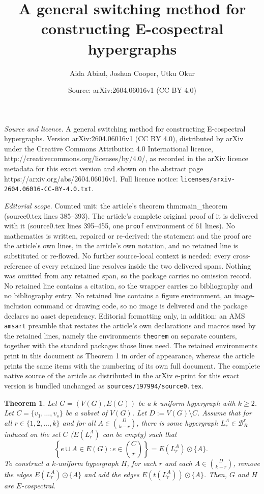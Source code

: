 \documentclass[10pt,a4paper]{amsart}
\title{A general switching method for constructing E-cospectral hypergraphs}
\author{Aida Abiad, Joshua Cooper, Utku Okur}
\date{Source: arXiv:2604.06016v1 (CC BY 4.0)}
\newtheorem{theorem}{Theorem}
\newcommand{\ev}[1]{( #1 )}
\begin{document}
\maketitle

\noindent\emph{Source and licence.} A general switching method for constructing E-cospectral hypergraphs. Version arXiv:2604.06016v1 (CC BY 4.0), distributed by arXiv under the Creative Commons Attribution 4.0 International licence, http://creativecommons.org/licenses/by/4.0/, as recorded in the arXiv licence metadata for this exact version and shown on the abstract page https://arxiv.org/abs/2604.06016v1. Full licence notice: \texttt{licenses/arxiv-2604.06016-CC-BY-4.0.txt}.\par\smallskip

\noindent\textit{Editorial scope.} Counted unit: the article's theorem thm:main\_theorem (source0.tex lines 385--393). The article's complete original proof of it is delivered with it (source0.tex lines 395--455, one \texttt{proof} environment of 61 lines). No mathematics is written, repaired or re-derived: the statement and the proof are the article's own lines, in the article's own notation, and no retained line is substituted or re-flowed.  No further source-local context is needed: every cross-reference of every retained line resolves inside the two delivered spans.  Nothing was omitted from any retained span, so the package carries no omission record.  No retained line contains a citation, so the wrapper carries no bibliography and no bibliography entry.  No retained line contains a figure environment, an image-inclusion command or drawing code, so no image is delivered and the package declares no asset dependency.  Editorial formatting only, in addition: an AMS \texttt{amsart} preamble that restates the article's own declarations and macros used by the retained lines, namely the environments \texttt{theorem} on separate counters, together with the standard packages those lines need.  The retained environments print in this document as Theorem 1 in order of appearance, whereas the article prints the same items with the numbering of its own full document.  The complete native source of the article as distributed in the arXiv e-print for this exact version is bundled unchanged as \texttt{sources/197994/source0.tex}.
\begin{theorem}
\label{thm:main_theorem}
Let $G = \ev{V\ev{G},E\ev{G}}$ be a $k$-uniform hypergraph with $k\geq 2$. Let $C=\{ v_1,\ldots,v_s \}$ be a subset of $V\ev{G}$. Let $D:= V\ev{G}\setminus C$. Assume that for all $r\in \{1,2,\ldots,k\}$ and for all $A \in \binom{D}{k-r} $, there is some hypergraph $L_r^A \in \mathcal{B}^{r}_{R}$ induced on the set $C$ ($E\ev{L_r^A}$ can be empty) such that 
\begin{equation}
\label{eqn:to_refer}
\text{$\left\{ e \cup A \in E\ev{G}: e\in \binom{C}{r} \right\} = E\ev{L_r^A} \odot \{A\}$. }
\end{equation}
To construct a $k$-uniform hypergraph $H$, for each $r$ and each $A \in \binom{D}{k-r}$, remove the edges $E\ev{L_r^A} \odot \{A\}$ and add the edges $ E\ev{t\ev{L_r^A}} \odot \{A\}$. Then, $G$ and $H$ are $E$-cospectral.
\end{theorem}
\end{document}
